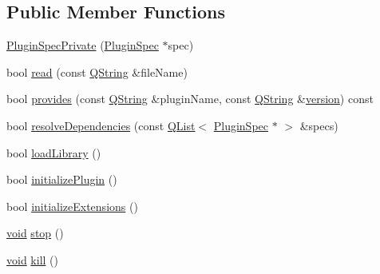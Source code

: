 \subsection*{Public Member Functions}
\begin{DoxyCompactItemize}
\item 
\hyperlink{class_extension_system_1_1_internal_1_1_plugin_spec_private_a0d44c8c936a8c62f5ad88ff19c70b9aa}{Plugin\-Spec\-Private} (\hyperlink{class_extension_system_1_1_plugin_spec}{Plugin\-Spec} $\ast$spec)
\item 
bool \hyperlink{class_extension_system_1_1_internal_1_1_plugin_spec_private_ab17f9aacac39aa19b98897bc6faafcd0}{read} (const \hyperlink{group___u_a_v_objects_plugin_gab9d252f49c333c94a72f97ce3105a32d}{Q\-String} \&file\-Name)
\item 
bool \hyperlink{class_extension_system_1_1_internal_1_1_plugin_spec_private_aafdcb363fa1e2f8af75c77b13d16f7c1}{provides} (const \hyperlink{group___u_a_v_objects_plugin_gab9d252f49c333c94a72f97ce3105a32d}{Q\-String} \&plugin\-Name, const \hyperlink{group___u_a_v_objects_plugin_gab9d252f49c333c94a72f97ce3105a32d}{Q\-String} \&\hyperlink{class_extension_system_1_1_internal_1_1_plugin_spec_private_a00cf7a310301d427a56b1b23576289bc}{version}) const 
\item 
bool \hyperlink{class_extension_system_1_1_internal_1_1_plugin_spec_private_a85aa6e98c8148c4d88b70118dc271f03}{resolve\-Dependencies} (const \hyperlink{class_q_list}{Q\-List}$<$ \hyperlink{class_extension_system_1_1_plugin_spec}{Plugin\-Spec} $\ast$ $>$ \&specs)
\item 
bool \hyperlink{class_extension_system_1_1_internal_1_1_plugin_spec_private_ae6c8e468abd33bfa0d2f3cc04afa14c9}{load\-Library} ()
\item 
bool \hyperlink{class_extension_system_1_1_internal_1_1_plugin_spec_private_a3bf586c7c6de7d0e8cbffc91a9895b25}{initialize\-Plugin} ()
\item 
bool \hyperlink{class_extension_system_1_1_internal_1_1_plugin_spec_private_ae5901e2eca5aa40d0c0525b40de51ccd}{initialize\-Extensions} ()
\item 
\hyperlink{group___u_a_v_objects_plugin_ga444cf2ff3f0ecbe028adce838d373f5c}{void} \hyperlink{class_extension_system_1_1_internal_1_1_plugin_spec_private_a19705e05760dcdf3dc55ace4e2e95f45}{stop} ()
\item 
\hyperlink{group___u_a_v_objects_plugin_ga444cf2ff3f0ecbe028adce838d373f5c}{void} \hyperlink{class_extension_system_1_1_internal_1_1_plugin_spec_private_a7581a0cfec32239b633b4689542a56db}{kill} ()
\end{DoxyCompactItemize}
